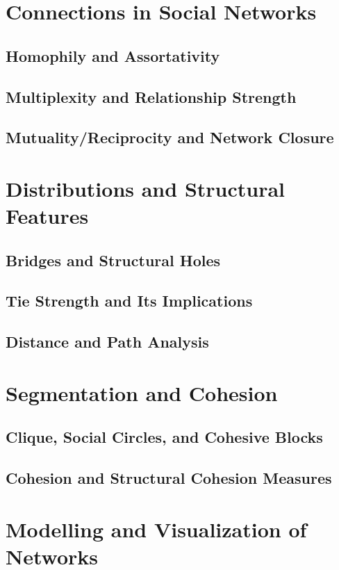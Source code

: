 \documentclass[12pt]{book} %
\begin{document}
\section{Connections in Social Networks}
\subsection{Homophily and Assortativity}
\subsection{Multiplexity and Relationship Strength}
\subsection{Mutuality/Reciprocity and Network Closure}

\section{Distributions and Structural Features}
\subsection{Bridges and Structural Holes}
\subsection{Tie Strength and Its Implications}
\subsection{Distance and Path Analysis}

\section{Segmentation and Cohesion}
\subsection{Clique, Social Circles, and Cohesive Blocks}
\subsection{Cohesion and Structural Cohesion Measures}

\section{Modelling and Visualization of Networks}
\end{document}

